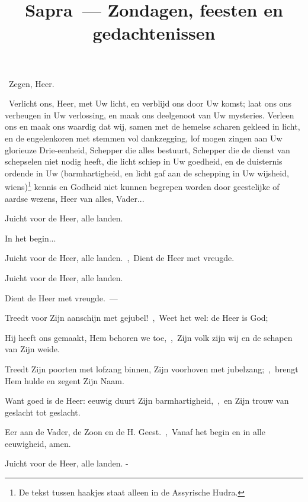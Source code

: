 \documentclass[12pt,twoside,a5paper]{article}
\begin{document}
\title{Sapra~--- Zondagen, feesten en gedachtenissen}
\author{}
\date{}
\maketitle


\begin{halfparskip}
\dd~Zegen, Heer.

\cc~Verlicht ons, Heer, met Uw licht, en verblijd ons door Uw komst; laat ons ons verheugen in Uw verlossing, en maak ons deelgenoot van Uw mysteries. Verleen ons en maak ons waardig dat wij, samen met de hemelse scharen gekleed in licht, en de engelenkoren met stemmen vol dankzegging, lof mogen zingen aan Uw glorieuze Drie-eenheid, Schepper die alles bestuurt, Schepper die de dienst van schepselen niet nodig heeft, die licht schiep in Uw goedheid, en de duisternis ordende in Uw (barmhartigheid, en licht gaf aan de schepping in Uw wijsheid, wiens)\footnote{De tekst tussen haakjes staat alleen in de Assyrische Hudra.} kennis en Godheid niet kunnen begrepen worden door geestelijke of aardse wezens, Heer van alles, Vader... 
\end{halfparskip}


\begin{halfparskip}
   Juicht voor de Heer, alle landen.

    In het begin...

  Juicht voor de Heer, alle landen.~\sep\ Dient de Heer met vreugde.

  \fullline
   

  Juicht voor de Heer, alle landen.

  Dient de Heer met vreugde.~--- 

  \fullline
   Treedt voor Zijn aanschijn met gejubel!~\sep\ Weet het wel: de Heer is God;

  Hij heeft ons gemaakt, Hem behoren we toe,~\sep\ Zijn volk zijn wij en de schapen van Zijn weide.

  Treedt Zijn poorten met lofzang binnen, Zijn voorhoven met jubelzang;~\sep\ brengt Hem hulde en zegent Zijn Naam.

  Want goed is de Heer: eeuwig duurt Zijn barmhartigheid,~\sep\ en Zijn trouw van geslacht tot geslacht.

  Eer aan de Vader, de Zoon en de H. Geest.~\sep\ Vanaf het begin en in alle eeuwigheid, amen.

  Juicht voor de Heer, alle landen. - 
\end{halfparskip}
\end{document}
